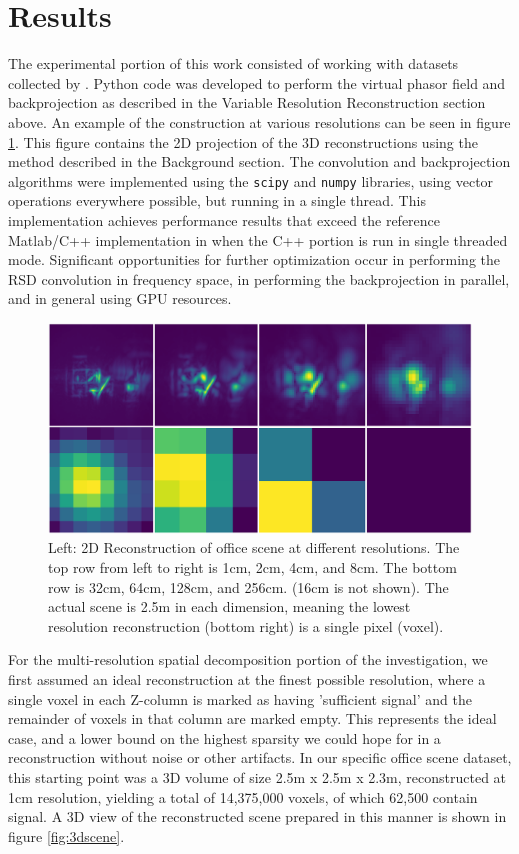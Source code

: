 \documentclass[conference]{IEEEtran}
\begin{document}
\section{Results}

The experimental portion of this work consisted of working with datasets collected by \cite{Liu2019}. Python code was developed to perform the virtual phasor field and backprojection as described in the Variable Resolution Reconstruction section above. An example of the construction at various resolutions can be seen in figure \ref{fig:multires}. This figure contains the 2D projection of the 3D reconstructions using the method described in the Background section. The convolution and backprojection algorithms were implemented using the \texttt{scipy} and \texttt{numpy} libraries, using vector operations everywhere possible, but running in a single thread. This implementation achieves performance results that exceed the reference Matlab/C++ implementation in \cite{Liu2019} when the C++ portion is run in single threaded mode. Significant opportunities for further optimization occur in performing the RSD convolution in frequency space, in performing the backprojection in parallel, and in general using GPU resources.

\begin{figure}
    \centering
        \includegraphics[width=\columnwidth]{figures/multires_2x4.png}
    \caption{Left: 2D Reconstruction of office scene at different resolutions. The top row from left to right is 1cm, 2cm, 4cm, and 8cm. The bottom row is 32cm, 64cm, 128cm, and 256cm. (16cm is not shown). The actual scene is 2.5m in each dimension, meaning the lowest resolution reconstruction (bottom right) is a single pixel (voxel).}
    \label{fig:multires}
\end{figure}

For the multi-resolution spatial decomposition portion of the investigation, we first assumed an ideal reconstruction at the finest possible resolution, where a single voxel in each Z-column is marked as having 'sufficient signal' and the remainder of voxels in that column are marked empty. This represents the ideal case, and a lower bound on the highest sparsity we could hope for in a reconstruction without noise or other artifacts. In our specific office scene dataset, this starting point was a 3D volume of size 2.5m x 2.5m x 2.3m, reconstructed at 1cm resolution, yielding a total of 14,375,000 voxels, of which 62,500 contain signal. A 3D view of the reconstructed scene prepared in this manner is shown in figure \ref{fig:3dscene}.
\end{document}
